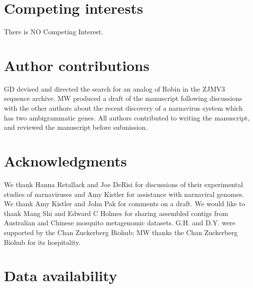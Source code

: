 \documentclass[unnumsec,webpdf,contemporary,large]{oup-authoring-template}%
\theoremstyle{thmstyleone}%
\theoremstyle{thmstyletwo}%
\theoremstyle{thmstylethree}%
\begin{document}
\section{Competing interests}
There is NO Competing Interest.

\section{Author contributions}

GD devised and directed the search for an analog of Robin in the ZJMV3 sequence
archive. MW produced a draft of the manuscript following discussions with the other
authors about the recent discovery of a narnavirus system which has two
ambigrammatic genes. All authors contributed to writing the manuscript, and
reviewed the manuscript before submission.


\section{Acknowledgments}

We thank Hanna Retallack and Joe DeRisi for discussions of their experimental
studies of narnaviruses and Amy Kistler for assistance with narnaviral genomes.
We thank Amy Kistler and John Pak for comments on a draft.  We would like to
thank Mang Shi and Edward C Holmes for sharing assembled contigs from
Australian and Chinese mosquito metagenomic datasets.
G.H. and D.Y. were supported by the Chan Zuckerberg Biohub;
MW thanks the Chan Zuckerberg Biohub for its hospitality.

\section{Data availability}






%
%
\end{document}
